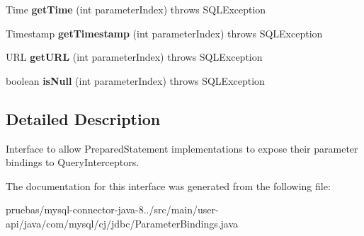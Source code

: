 \begin{DoxyCompactItemize}
Time {\bfseries get\+Time} (int parameter\+Index)  throws S\+Q\+L\+Exception
\item 
\mbox{\label{interfacecom_1_1mysql_1_1cj_1_1jdbc_1_1_parameter_bindings_abb261478b55064db1938f837095feca7}} 
Timestamp {\bfseries get\+Timestamp} (int parameter\+Index)  throws S\+Q\+L\+Exception
\item 
\mbox{\label{interfacecom_1_1mysql_1_1cj_1_1jdbc_1_1_parameter_bindings_af28f57a78ba506316209ee5a758b2bfe}} 
U\+RL {\bfseries get\+U\+RL} (int parameter\+Index)  throws S\+Q\+L\+Exception
\item 
\mbox{\label{interfacecom_1_1mysql_1_1cj_1_1jdbc_1_1_parameter_bindings_a0b42ffb9b34b6391e72fb8a67630f7f1}} 
boolean {\bfseries is\+Null} (int parameter\+Index)  throws S\+Q\+L\+Exception
\end{DoxyCompactItemize}


\subsection{Detailed Description}
Interface to allow Prepared\+Statement implementations to expose their parameter bindings to Query\+Interceptors. 

The documentation for this interface was generated from the following file\+:\begin{DoxyCompactItemize}
\item 
pruebas/mysql-\/connector-\/java-\/8../src/main/user-\/api/java/com/mysql/cj/jdbc/Parameter\+Bindings.\+java\end{DoxyCompactItemize}
